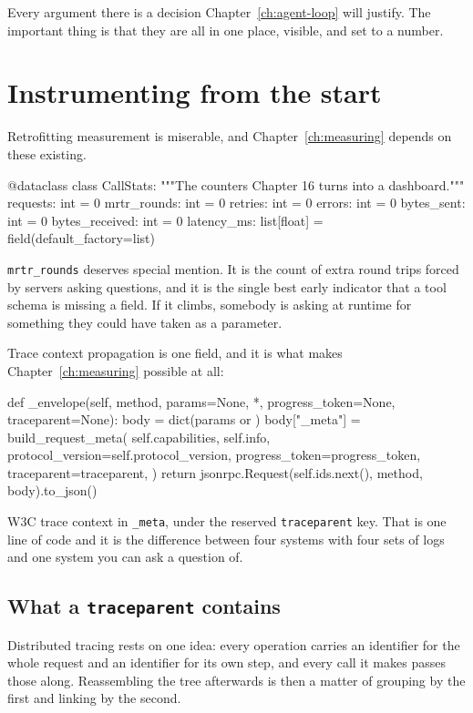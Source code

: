 Every argument there is a decision Chapter~\ref{ch:agent-loop} will justify. The
important thing is that they are all in one place, visible, and set to a number.

\section{Instrumenting from the start}

Retrofitting measurement is miserable, and Chapter~\ref{ch:measuring} depends on
these existing.

\begin{py}
@dataclass
class CallStats:
    """The counters Chapter 16 turns into a dashboard."""
    requests: int = 0
    mrtr_rounds: int = 0
    retries: int = 0
    errors: int = 0
    bytes_sent: int = 0
    bytes_received: int = 0
    latency_ms: list[float] = field(default_factory=list)
\end{py}

\texttt{mrtr\_rounds} deserves special mention. It is the count of extra round
trips forced by servers asking questions, and it is the single best early
indicator that a tool schema is missing a field. If it climbs, somebody is
asking at runtime for something they could have taken as a parameter.

Trace context propagation is one field, and it is what makes
Chapter~\ref{ch:measuring} possible at all:

\begin{py}
def _envelope(self, method, params=None, *, progress_token=None,
              traceparent=None):
    body = dict(params or {})
    body["_meta"] = build_request_meta(
        self.capabilities, self.info,
        protocol_version=self.protocol_version,
        progress_token=progress_token,
        traceparent=traceparent,
    )
    return jsonrpc.Request(self.ids.next(), method, body).to_json()
\end{py}

W3C trace context in \texttt{\_meta}, under the reserved \texttt{traceparent}
key. That is one line of code and it is the difference between four systems with
four sets of logs and one system you can ask a question of.

\subsection{What a \texttt{traceparent} contains}

Distributed tracing rests on one idea: every operation carries an identifier for
the whole request and an identifier for its own step, and every call it makes
passes those along. Reassembling the tree afterwards is then a matter of
grouping by the first and linking by the second.

